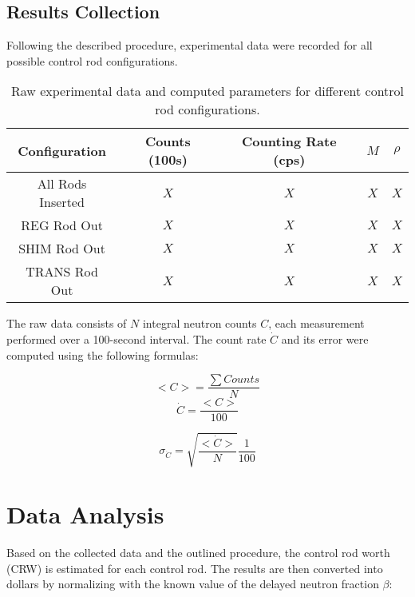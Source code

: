 \subsection{Results Collection}

Following the described procedure, experimental data were recorded for all possible control rod configurations.

\begin{table}[H]
    \centering
    \begin{tabular}{|c|c|c|c|c|}
        \hline
        \textbf{Configuration} & \textbf{Counts (100s)} & \textbf{Counting Rate (cps)} & \textbf{$M$} & \textbf{$\rho$} \\
        \hline
        All Rods Inserted & $X$ & $X$ & $X$ & $X$ \\
        REG Rod Out & $X$ & $X$ & $X$ & $X$ \\
        SHIM Rod Out & $X$ & $X$ & $X$ & $X$ \\
        TRANS Rod Out & $X$ & $X$ & $X$ & $X$ \\
        \hline
    \end{tabular}
    \caption{Raw experimental data and computed parameters for different control rod configurations.}
    \label{tab:results}
\end{table}

The raw data consists of $N$ integral neutron counts $C$, each measurement performed over a 100-second interval. The count rate $\dot{C}$ and its error were computed using the following formulas:

\begin{equation}
<C> = \frac{\sum{Counts}}{N}
\end{equation}
\begin{equation}
\dot{C} = \frac{<C>}{100}
\end{equation}

\begin{equation}
\sigma_{\dot{C}} = \sqrt{\frac{\dot{<C>}}{N}} \frac{1}{100}
\end{equation}







\section{Data Analysis}

Based on the collected data and the outlined procedure, the control rod worth (CRW) is estimated for each control rod. The results are then converted into dollars by normalizing with the known value of the delayed neutron fraction $\beta$:

